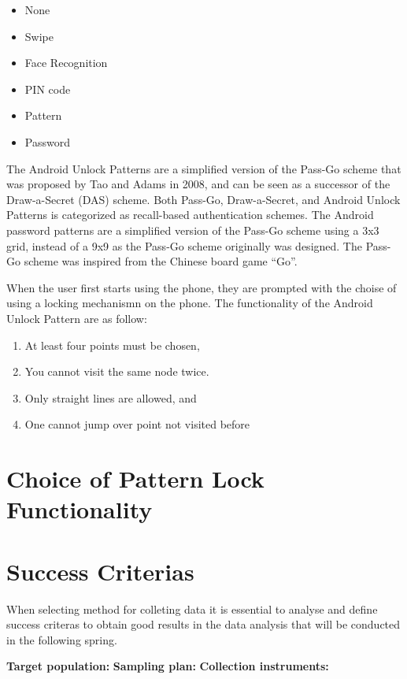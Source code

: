       \begin{itemize}
        \item None
        \item Swipe
        \item Face Recognition
        \item PIN code
        \item Pattern
        \item Password
      \end{itemize}
    
    The Android Unlock Patterns are a simplified version of the Pass-Go scheme that was proposed by Tao and Adams in 2008, and can be seen as a successor of the Draw-a-Secret (DAS) scheme. Both Pass-Go, Draw-a-Secret, and Android Unlock Patterns is categorized as recall-based authentication schemes.
    The Android password patterns are a simplified version of the Pass-Go scheme using a 3x3 grid, instead of a 9x9 as the Pass-Go scheme originally was designed. The Pass-Go scheme was inspired from the Chinese board game ``Go''.

    When the user first starts using the phone, they are prompted with the choise of using a locking mechanismn on the phone. The functionality of the Android Unlock Pattern are as follow: 
      \begin{enumerate}
        \item At least four points must be chosen,
        \item You cannot visit the same node twice.
        \item Only straight lines are allowed, and
        \item One cannot jump over point not visited before
      \end{enumerate}

  \section{Choice of Pattern Lock Functionality}

  \section{Success Criterias}

    When selecting method for colleting data it is essential to analyse and define success criteras to obtain good results in the data analysis that will be conducted in the following spring. 

    {\bf Target population:}
    {\bf Sampling plan:}
    {\bf Collection instruments:}
    

